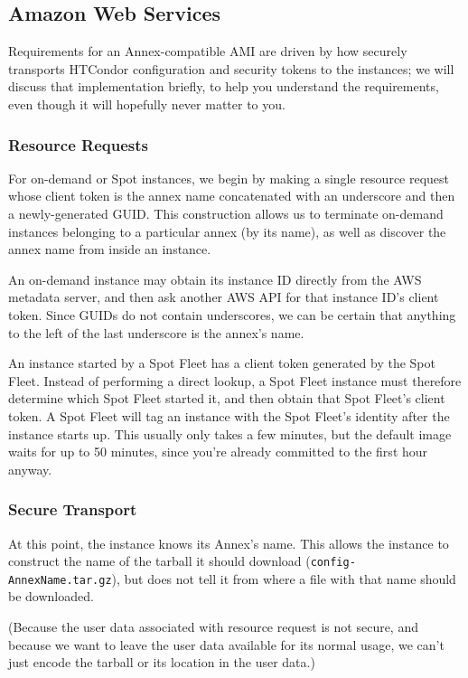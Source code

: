 \subsection{\label{sec:clouds-services-aws}Amazon Web Services}

Requirements for an Annex-compatible AMI are driven by how 
securely transports HTCondor configuration and security tokens to the
instances; we will discuss that implementation briefly, to help you
understand the requirements, even though it will hopefully never matter
to you.

\subsubsection{Resource Requests}

For on-demand or Spot instances, we begin by making a single resource request
whose client token is the annex name concatenated with an underscore and then
a newly-generated GUID.  This construction allows us to terminate on-demand
instances belonging to a particular annex (by its name), as well as discover
the annex name from inside an instance.

An on-demand instance may obtain its instance ID directly from the AWS
metadata server, and then ask another AWS API for that instance ID's
client token.  Since GUIDs do not contain underscores, we can be certain
that anything to the left of the last underscore is the annex's name.

An instance started by a Spot Fleet has a client token generated by the
Spot Fleet.  Instead of performing a direct lookup, a Spot Fleet instance
must therefore determine which Spot Fleet started it, and then obtain that
Spot Fleet's client token.  A Spot Fleet will tag an instance with the
Spot Fleet's identity after the instance starts up.  This usually only
takes a few minutes, but the default image waits for up to 50 minutes,
since you're already committed to the first hour anyway.

\subsubsection{Secure Transport}

At this point, the instance knows its Annex's name.  This allows the
instance to construct the name of the tarball it should download
({\tt config-AnnexName.tar.gz}), but does not tell it from where a file
with that name should be downloaded.

(Because the user data associated with resource request is not secure,
and because we want to leave the user data available for its normal
usage, we can't just encode the tarball or its location in the user data.)

